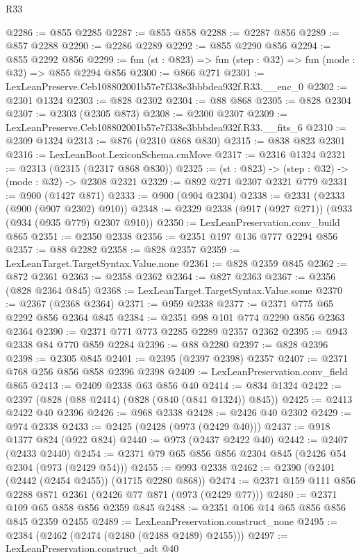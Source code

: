 \begin{lexlean}{R33}
\begin{coremodule}
@2286 := @855 @2285
@2287 := @855 @858
@2288 := @2287 @856
@2289 := @857 @2288
@2290 := @2286 @2289
@2292 := @855 @2290 @856
@2294 := @855 @2292 @856
@2299 := fun (st : @823) => fun (step : @32) => fun (mode : @32) => @855 @2294 @856
@2300 := @866 @271
@2301 := LexLeanPreserve.Ceb108802001b57e7f338e3bbbdea932f.R33.__enc_0
@2302 := @2301 @1324
@2303 := @828 @2302
@2304 := @88 @868
@2305 := @828 @2304
@2307 := @2303 (@2305 @873)
@2308 := @2300 @2307
@2309 := LexLeanPreserve.Ceb108802001b57e7f338e3bbbdea932f.R33.__fits_6
@2310 := @2309 @1324
@2313 := @876 (@2310 @868 @830)
@2315 := @838 @823 @2301
@2316 := LexLeanBoot.LexiconSchema.cmMove
@2317 := @2316 @1324
@2321 := @2313 (@2315 (@2317 @868 @830))
@2325 := (st : @823) -> (step : @32) -> (mode : @32) -> @2308 @2321
@2329 := @892 @271 @2307 @2321 @779
@2331 := @900 (@1427 @871)
@2333 := @900 (@904 @2304)
@2338 := @2331 (@2333 (@900 (@907 @2302) @910))
@2348 := @2329 @2338 (@917 (@927 @271)) (@933 (@934 (@935 @779) @2307 @910))
@2350 := LexLeanPreservation.conv_build @865
@2351 := @2350 @2338
@2356 := @2351 @197 @136 @777 @2294 @856
@2357 := @88 @2282
@2358 := @828 @2357
@2359 := LexLeanTarget.TargetSyntax.Value.none
@2361 := @828 @2359 @845
@2362 := @872 @2361
@2363 := @2358 @2362
@2364 := @827 @2363
@2367 := @2356 (@828 @2364 @845)
@2368 := LexLeanTarget.TargetSyntax.Value.some
@2370 := @2367 (@2368 @2364)
@2371 := @959 @2338
@2377 := @2371 @775 @65 @2292 @856 @2364 @845
@2384 := @2351 @98 @101 @774 @2290 @856 @2363 @2364
@2390 := @2371 @771 @773 @2285 @2289 @2357 @2362
@2395 := @943 @2338 @84 @770 @859 @2284
@2396 := @88 @2280
@2397 := @828 @2396
@2398 := @2305 @845
@2401 := @2395 (@2397 @2398) @2357
@2407 := @2371 @768 @256 @856 @858 @2396 @2398
@2409 := LexLeanPreservation.conv_field @865
@2413 := @2409 @2338 @63 @856 @40
@2414 := @834 @1324
@2422 := @2397 (@828 (@88 @2414) (@828 (@840 (@841 @1324)) @845))
@2425 := @2413 @2422 @40 @2396
@2426 := @968 @2338
@2428 := @2426 @40 @2302
@2429 := @974 @2338
@2433 := @2425 (@2428 (@973 (@2429 @40)))
@2437 := @918 @1377 @824 (@922 @824)
@2440 := @973 (@2437 @2422 @40)
@2442 := @2407 (@2433 @2440)
@2454 := @2371 @79 @65 @856 @856 @2304 @845 (@2426 @54 @2304 (@973 (@2429 @54)))
@2455 := @993 @2338
@2462 := @2390 (@2401 (@2442 (@2454 @2455)) (@1715 @2280 @868))
@2474 := @2371 @159 @111 @856 @2288 @871 @2361 (@2426 @77 @871 (@973 (@2429 @77)))
@2480 := @2371 @109 @65 @858 @856 @2359 @845
@2488 := @2351 @106 @14 @65 @856 @856 @845 @2359 @2455
@2489 := LexLeanPreservation.construct_none
@2495 := @2384 (@2462 (@2474 (@2480 (@2488 @2489) @2455)))
@2497 := LexLeanPreservation.construct_adt @40

\end{coremodule}
\end{lexlean}

